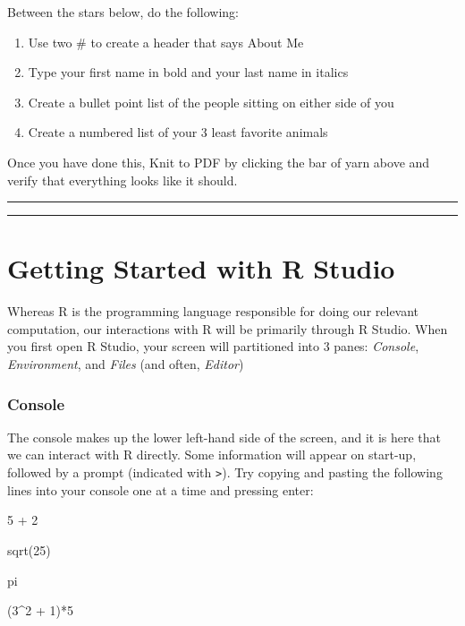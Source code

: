 \documentclass[
]{article}
\providecommand{\tightlist}{%
  \setlength{\itemsep}{0pt}\setlength{\parskip}{0pt}}
\begin{document}
Between the stars below, do the following:

\begin{enumerate}
\def\labelenumi{\arabic{enumi}.}
\tightlist
\item
  Use two \# to create a header that says About Me
\item
  Type your first name in bold and your last name in italics
\item
  Create a bullet point list of the people sitting on either side of you
\item
  Create a numbered list of your 3 least favorite animals
\end{enumerate}

Once you have done this, Knit to PDF by clicking the bar of yarn above
and verify that everything looks like it should.

\begin{center}\rule{0.5\linewidth}{0.5pt}\end{center}

\begin{center}\rule{0.5\linewidth}{0.5pt}\end{center}

\section{Getting Started with R
Studio}\label{getting-started-with-r-studio}

Whereas R is the programming language responsible for doing our relevant
computation, our interactions with R will be primarily through R Studio.
When you first open R Studio, your screen will partitioned into 3 panes:
\emph{Console}, \emph{Environment}, and \emph{Files} (and often,
\emph{Editor})

\subsubsection{Console}\label{console}

The console makes up the lower left-hand side of the screen, and it is
here that we can interact with R directly. Some information will appear
on start-up, followed by a prompt (indicated with
\texttt{\textgreater{}}). Try copying and pasting the following lines
into your console one at a time and pressing enter:

5 + 2

sqrt(25)

pi

(3\^{}2 + 1)*5
\end{document}
